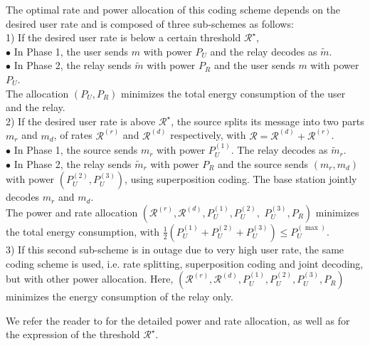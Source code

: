 \documentclass[journal]{IEEEtran}
\theoremstyle{definition}
\begin{document}
The optimal rate and power allocation of this coding scheme depends on the desired user rate and is composed of three sub-schemes as follows: \\
1) If the desired user rate is below a certain threshold $\mathcal{R}^\star$, \\
\hspace*{15pt}$\bullet$ In Phase 1, the user sends $m$ with power $P_U$ and the relay decodes as $\tilde{m}$. \\
\hspace*{15pt}$\bullet$ In Phase 2, the relay sends $\tilde{m}$ with power $P_R$ and the user sends $m$ with power $P_U$. \\
The allocation $\left(P_U,P_R\right)$ minimizes the total energy consumption of the user and the relay.
\\
2) If the desired user rate is above $\mathcal{R}^\star$, the source splits its message into two parts $m_r$ and $m_d$, of rates $\mathcal{R}^{(r)}$ and $\mathcal{R}^{(d)}$ respectively, with $\mathcal{R} = \mathcal{R}^{(d)}+\mathcal{R}^{(r)}$. \\
\hspace*{15pt}$\bullet$ In Phase 1, the source sends $m_r$ with power $P_U^{(1)}$. The relay decodes as $\tilde{m}_r$.\\
\hspace*{15pt}$\bullet$ In Phase 2, the relay sends $\tilde{m}_r$ with power $P_R$ and the source sends $(m_r,m_d)$ with power $(P_U^{(2)},P_U^{(3)})$, using superposition coding. The base station jointly decodes $m_r$ and $m_d$.
\\ The power and rate allocation $\left(\mathcal{R}^{(r)},\mathcal{R}^{(d)},P_U^{(1)},P_U^{(2)},\right.$ $\left.P_U^{(3)},P_R\right)$ minimizes the total energy consumption, with $\frac{1}{2} \left( P_U^{(1)} + P_U^{(2)} +P_U^{(3)}\right) \leq P_U^{(\max)}$.
\\
3) If this second sub-scheme is in outage due to very high user rate, the same coding scheme is used, i.e. rate splitting, superposition coding and joint decoding, but with other power allocation. Here, $\left(\mathcal{R}^{(r)},\mathcal{R}^{(d)},P_U^{(1)},P_U^{(2)},P_U^{(3)},P_R\right)$ minimizes the energy consumption of the relay only.



We refer the reader to \cite{Journal1} for the detailed power and rate allocation, as well as for the expression of  the threshold $\mathcal{R}^\star$.
\end{document}

